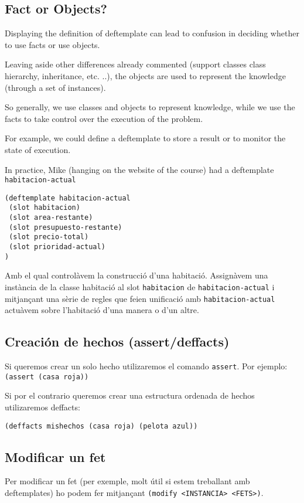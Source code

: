 \documentclass[11pt,svgnames]{scrbook}
\begin{document}
\subsection{Fact or Objects?}
Displaying the definition of deftemplate can lead to confusion in deciding whether to use facts or use objects.

Leaving aside other differences already commented (support classes
class hierarchy, inheritance, etc. ..), the objects are used to
represent the knowledge (through a set of instances).

So generally, we use classes and objects to represent knowledge, while we use the facts to take control over the execution of the problem.

For example, we could define a deftemplate to store a result or to monitor the state of execution.

In practice, Mike (hanging on the website of the course) had a deftemplate \texttt{habitacion-actual}

\begin{verbatim}
(deftemplate habitacion-actual
 (slot habitacion)
 (slot area-restante)
 (slot presupuesto-restante)
 (slot precio-total)
 (slot prioridad-actual)
)
\end{verbatim}

Amb el qual controlàvem la construcció d'una habitació. Assignàvem una instància de la classe
habitació al slot \texttt{habitacion} de \texttt{habitacion-actual} i mitjançant una sèrie de regles
que feien unificació amb \texttt{habitacion-actual} actuàvem sobre l'habitació d'una manera o d'un
altre.

\subsection{Creación de hechos (assert/deffacts)}

Si queremos crear un solo hecho utilizaremos el comando \texttt{assert}. Por ejemplo:
\texttt{(assert (casa roja))}

Si por el contrario queremos crear una estructura ordenada de hechos utilizaremos deffacts:
\medskip

\texttt{(deffacts mishechos (casa roja) (pelota azul))}




\subsection{Modificar un fet}


Per modificar un fet (per exemple, molt útil si estem treballant amb deftemplates) ho podem fer mitjançant \texttt{(modify <INSTANCIA> <FETS>)}.
\end{document}
